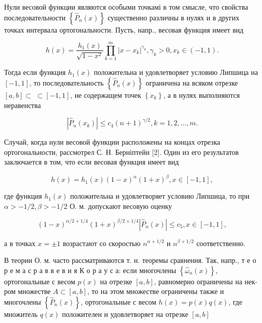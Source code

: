 \documentclass[10pt]{article}
\begin{document}
Нули весовой функции являются особыми точкамі в том смысле, что свойства последовательности $\left\{\hat{P}_{n}(x)\right\}$ существенно различны в нулях и в других точках интервала ортогональности. Пусть, напр., весовая функция имеет вид



\[

h(x)=\frac{h_{1}(x)}{\sqrt{1-x^{2}}} \prod_{k=1}^{m}\left|x-x_{k}\right|^{\gamma_{k}}, \gamma_{k}>0, x_{k} \in(-1,1) .

\]



Тогда если функция $h_{1}(x)$ положительна и удовлетворяет условию Липшица на $[-1,1]$, то последовательность $\left\{\hat{P}_{n}(x)\right\}$ ограничена на всяком отрезке $[a, b] \subset$ $\subset[-1,1]$, не содержащем точек $\left\{x_{k}\right\}$, а в нулях выполняются неравенства



\[

\left|\hat{P}_{n}\left(x_{k}\right)\right| \leqslant c_{4}(n+1)^{\gamma / 2}, k=1,2, \ldots, m .

\]



Случай, когда нули весовой функции расположены на концах отрезка ортогональности, рассмотрел С. Н. Берніптейн [2]. Один из его результатов заключается в том, что если весовая функция имеет вид



\[

h(x)=h_{1}(x)(1-x)^{\alpha}(1+x)^{\beta}, x \in[-1,1],

\]



где функция $h_{1}(x)$ положительна и удовлетворяет условию Липшица, то при $\alpha>-1 / 2, \beta>-1 / 2$ О. м. допускают весовую оценку



\[

(1-x)^{\alpha / 2+1 / 4}(1+x)^{\beta / 2+1 / 4}\left|\hat{P}_{n}(x)\right| \leqslant c_{5}, x \in[-1,1],

\]



а в точках $x= \pm 1$ возрастают со скоростью $n^{\alpha+1 / 2}$ и $n^{\beta+1 / 2}$ соответственно.



В теории О. м. часто рассматриваются т. н. теоремы сравнения. Так, напр., т е о р е м а с р а в в е в и я К о р а у с а: если многочлены $\left\{\hat{\omega}_{n}(x)\right\}$, ортогональные с весом $p(x)$ на отрезке $[a, b]$, равномерно ограничены на нек-ром множестве $A \subset[a, b]$, то на этом множестве ограничены также и многочлены $\left\{\hat{P}_{n}(x)\right\}$, ортогональные с весом $h(x)=p(x) q(x)$, где множитель $q(x)$ положителен и удовлетворяет на отрезке $[a, b]$
\end{document}

